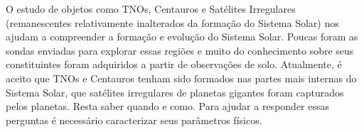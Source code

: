 \documentclass[12pt,a4paper]{monografia}
\begin{document}
\qualify


\maketitle



\indent \indent O estudo de objetos como TNOs, Centauros e Satélites Irregulares (remanescentes relativamente inalterados da formação do Sistema Solar) nos ajudam a compreender a formação e evolução do Sistema Solar. Poucas foram as sondas enviadas para explorar essas regiões e muito do conhecimento sobre seus constituintes foram adquiridos a partir de observações de solo. Atualmente, é aceito que TNOs e Centauros tenham sido formados nas partes mais internas do Sistema Solar, que satélites irregulares de planetas gigantes foram capturados pelos planetas. Resta saber quando e como. Para ajudar a responder essas perguntas é necessário caracterizar seus parâmetros físicos.
\end{document}

